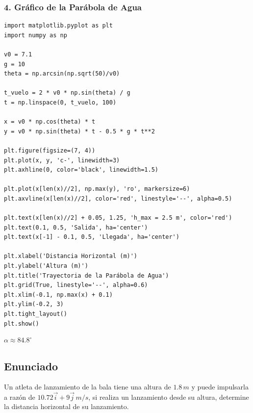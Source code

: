 \documentclass[12pt, a4paper]{article}
\begin{document}
\subsubsection*{4. Gráfico de la Parábola de Agua}
\begin{verbatim}
import matplotlib.pyplot as plt
import numpy as np

v0 = 7.1
g = 10
theta = np.arcsin(np.sqrt(50)/v0)

t_vuelo = 2 * v0 * np.sin(theta) / g
t = np.linspace(0, t_vuelo, 100)

x = v0 * np.cos(theta) * t
y = v0 * np.sin(theta) * t - 0.5 * g * t**2

plt.figure(figsize=(7, 4))
plt.plot(x, y, 'c-', linewidth=3)
plt.axhline(0, color='black', linewidth=1.5)

plt.plot(x[len(x)//2], np.max(y), 'ro', markersize=6)
plt.axvline(x[len(x)//2], color='red', linestyle='--', alpha=0.5)

plt.text(x[len(x)//2] + 0.05, 1.25, 'h_max = 2.5 m', color='red')
plt.text(0.1, 0.5, 'Salida', ha='center')
plt.text(x[-1] - 0.1, 0.5, 'Llegada', ha='center')

plt.xlabel('Distancia Horizontal (m)')
plt.ylabel('Altura (m)')
plt.title('Trayectoria de la Parábola de Agua')
plt.grid(True, linestyle='--', alpha=0.6)
plt.xlim(-0.1, np.max(x) + 0.1)
plt.ylim(-0.2, 3)
plt.tight_layout()
plt.show()
\end{verbatim}

\begin{tcolorbox}[colback=green!5!white, colframe=green!50!black, title=Respuesta Final]
\centering \Large $\alpha \approx 84.8^\circ$
\end{tcolorbox}

\newpage

\subsection*{Enunciado}
Un atleta de lanzamiento de la bala tiene una altura de $1.8 \, \si{m}$ y puede impulsarla a razón de $10.72\vec{i} + 9\vec{j} \, \si{m/s}$, si realiza un lanzamiento desde su altura, determine la distancia horizontal de su lanzamiento.

\begin{center}
\end{center}
\end{document}
